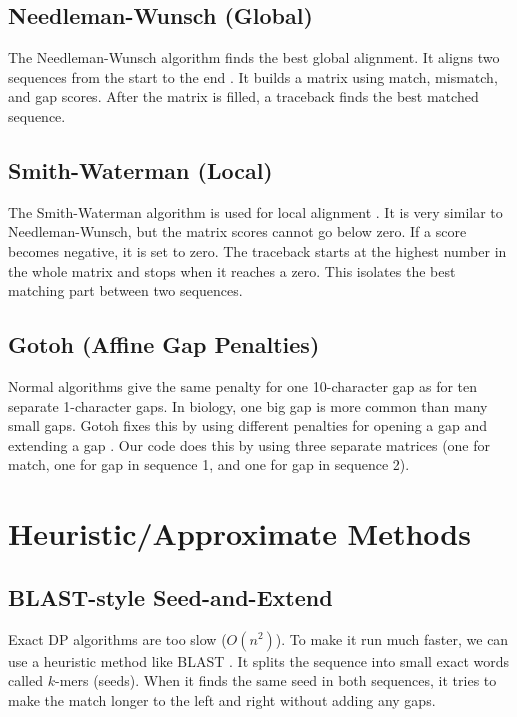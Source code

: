 \documentclass[Assignment,MME,english]{twbook}
\begin{document}
\subsection{Needleman-Wunsch (Global)}
The Needleman-Wunsch algorithm finds the best global alignment. It aligns two sequences from the start to the end \cite{needleman1970}. It builds a matrix using match, mismatch, and gap scores. After the matrix is filled, a traceback finds the best matched sequence.

\subsection{Smith-Waterman (Local)}
The Smith-Waterman algorithm is used for local alignment \cite{smith1981}. It is very similar to Needleman-Wunsch, but the matrix scores cannot go below zero. If a score becomes negative, it is set to zero. The traceback starts at the highest number in the whole matrix and stops when it reaches a zero. This isolates the best matching part between two sequences.

\subsection{Gotoh (Affine Gap Penalties)}
Normal algorithms give the same penalty for one 10-character gap as for ten separate 1-character gaps. In biology, one big gap is more common than many small gaps. Gotoh fixes this by using different penalties for opening a gap and extending a gap \cite{gotoh1982}. Our code does this by using three separate matrices (one for match, one for gap in sequence 1, and one for gap in sequence 2).

\section{Heuristic/Approximate Methods}
\subsection{BLAST-style Seed-and-Extend}
Exact DP algorithms are too slow ($O(n^2)$). To make it run much faster, we can use a heuristic method like BLAST \cite{altschul1990}. It splits the sequence into small exact words called $k$-mers (seeds). When it finds the same seed in both sequences, it tries to make the match longer to the left and right without adding any gaps.
\end{document}
